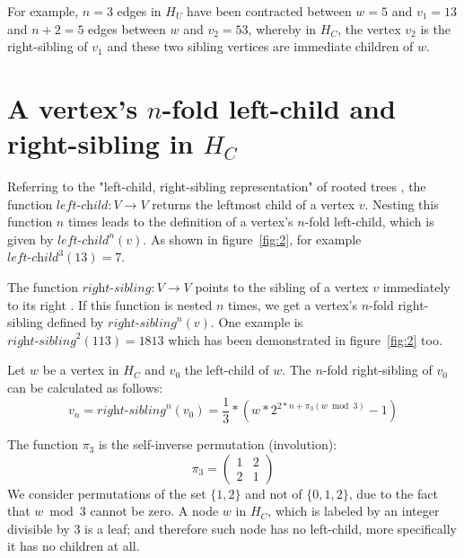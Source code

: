 For example, $n=3$ edges in $H_U$ have been contracted between $w=5$ and $v_1=13$ and $n+2=5$ edges between $w$ and $v_2=53$, whereby in $H_C$, the vertex $v_2$ is the right-sibling of $v_1$ and these two sibling vertices are immediate children of $w$.

\section{A vertex's \mbox{$n$}-fold left-child and right-sibling in \mbox{$H_C$}}
Referring to the "left-child, right-sibling representation" of rooted trees \cite[p.~246]{Ref_Cormen_Leiserson_Rivest_Stein}, the function $\textit{left-child}:V\rightarrow V$ returns the leftmost child of a vertex $v$. Nesting this function $n$ times leads to the definition of a vertex's $n$-fold left-child, which is given by $\textit{left-child}^n(v)$. As shown in figure~\ref{fig:2}, for example $\textit{left-child}^3(13)=7$.

\par\medskip
The function $\textit{right-sibling}:V\rightarrow V$ points to the sibling of a vertex $v$ immediately to its right \cite[p.~246]{Ref_Cormen_Leiserson_Rivest_Stein}. If this function is nested $n$ times, we get a vertex's $n$-fold right-sibling defined by $\textit{right-sibling}^n(v)$. One example is $\textit{right-sibling}^2(113)=1813$ which has been demonstrated in figure~\ref{fig:2} too.

\par\medskip
Let $w$ be a vertex in $H_C$ and $v_0$ the left-child of $w$. The $n$-fold right-sibling of $v_0$ can be calculated as follows:
\begin{equation}
\label{eq:nfold_right_sibling}
	v_n=\textit{right-sibling}^n(v_0)=\frac{1}{3}*\left(w*2^{2*n+\pi_3(w\bmod 3)}-1\right)
\end{equation}

The function $\pi_3$ is the self-inverse permutation (involution):
\begin{equation}
\label{eq:pi_3}
	\pi_3=\left(\begin{array}{cc}
	1 & 2\\
	2 & 1
	\end{array}\right)
\end{equation}
We consider permutations of the set $\{1,2\}$ and not of $\{0,1,2\}$, due to the fact that $w\bmod 3$ cannot be zero. A node $w$ in $H_C$, which is labeled by an integer divisible by $3$ is a leaf; and therefore such node has no left-child, more specifically it has no children at all.

